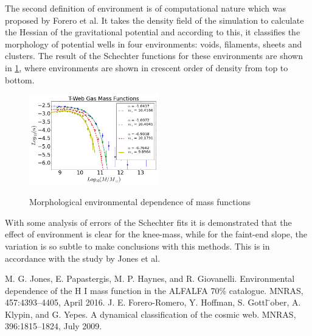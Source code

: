 \documentclass[preprint,proceedings]{rmaa}
\begin{document}
The second definition of environment is of computational nature which was proposed by Forero et al. It takes the density field of the simulation to calculate the Hessian of the gravitational potential and according to this, it classifies the morphology of potential wells in four environments: voids, filaments, sheets and clusters. The result of the Schechter functions for these environments are shown in \ref{fig2}, where environments are shown in crescent order of density from top to bottom.

\begin{figure}[h!]
\centering
\includegraphics[width=0.5\textwidth]{environment2}
\label{fig2}
\caption{Morphological environmental dependence of mass functions}

\centering
\end{figure}

 With some analysis of errors of the Schechter fits it is demonstrated that the effect of environment is clear for the knee-mass, while for the faint-end slope, the variation is so subtle to make conclusions with this methods. This is in accordance with the study by Jones et al. \\
 
\begin{thebibliography}
M. G. Jones, E. Papastergis, M. P. Haynes, and R. Giovanelli. Environmental dependence of the H I mass function in the ALFALFA 70\% catalogue. MNRAS, 457:4393–4405, April 2016.
J. E. Forero-Romero, Y. Hoffman, S. Gottl ̈ober, A. Klypin, and G. Yepes. A dynamical classification of the cosmic web. MNRAS, 396:1815–1824, July 2009.

  
\end{thebibliography}
\end{document}
